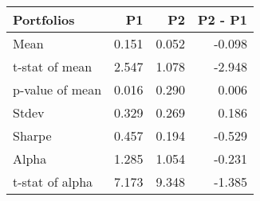 \begin{tabular}{lrrr}
\toprule
Portfolios & P1 & P2 & P2 - P1 \\
\midrule
Mean & 0.151 & 0.052 & -0.098 \\
t-stat of mean & 2.547 & 1.078 & -2.948 \\
p-value of mean & 0.016 & 0.290 & 0.006 \\
Stdev & 0.329 & 0.269 & 0.186 \\
Sharpe & 0.457 & 0.194 & -0.529 \\
Alpha & 1.285 & 1.054 & -0.231 \\
t-stat of alpha & 7.173 & 9.348 & -1.385 \\
\bottomrule
\end{tabular}
